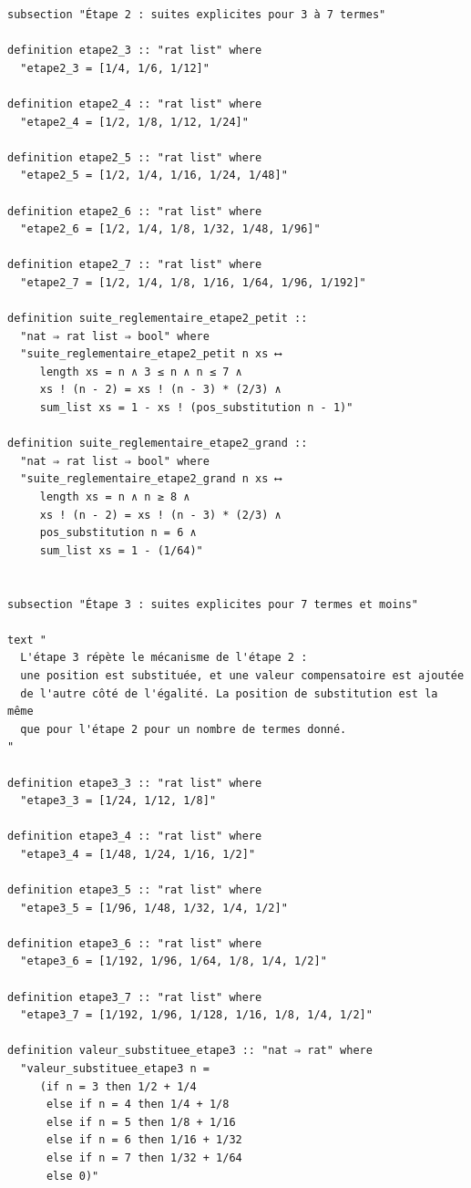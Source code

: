 \documentclass[a4paper,11pt]{article}
\begin{document}
\begin{holcode}[title={\textcolor{white}{Fichier : methode\_de\_philippot.thy -- COMPLET}}]
\begin{lstlisting}
subsection "Étape 2 : suites explicites pour 3 à 7 termes"

definition etape2_3 :: "rat list" where
  "etape2_3 = [1/4, 1/6, 1/12]"

definition etape2_4 :: "rat list" where
  "etape2_4 = [1/2, 1/8, 1/12, 1/24]"

definition etape2_5 :: "rat list" where
  "etape2_5 = [1/2, 1/4, 1/16, 1/24, 1/48]"

definition etape2_6 :: "rat list" where
  "etape2_6 = [1/2, 1/4, 1/8, 1/32, 1/48, 1/96]"

definition etape2_7 :: "rat list" where
  "etape2_7 = [1/2, 1/4, 1/8, 1/16, 1/64, 1/96, 1/192]"

definition suite_reglementaire_etape2_petit ::
  "nat ⇒ rat list ⇒ bool" where
  "suite_reglementaire_etape2_petit n xs ⟷
     length xs = n ∧ 3 ≤ n ∧ n ≤ 7 ∧
     xs ! (n - 2) = xs ! (n - 3) * (2/3) ∧
     sum_list xs = 1 - xs ! (pos_substitution n - 1)"

definition suite_reglementaire_etape2_grand ::
  "nat ⇒ rat list ⇒ bool" where
  "suite_reglementaire_etape2_grand n xs ⟷
     length xs = n ∧ n ≥ 8 ∧
     xs ! (n - 2) = xs ! (n - 3) * (2/3) ∧
     pos_substitution n = 6 ∧
     sum_list xs = 1 - (1/64)"


subsection "Étape 3 : suites explicites pour 7 termes et moins"

text "
  L'étape 3 répète le mécanisme de l'étape 2 :
  une position est substituée, et une valeur compensatoire est ajoutée
  de l'autre côté de l'égalité. La position de substitution est la même
  que pour l'étape 2 pour un nombre de termes donné.
"

definition etape3_3 :: "rat list" where
  "etape3_3 = [1/24, 1/12, 1/8]"

definition etape3_4 :: "rat list" where
  "etape3_4 = [1/48, 1/24, 1/16, 1/2]"

definition etape3_5 :: "rat list" where
  "etape3_5 = [1/96, 1/48, 1/32, 1/4, 1/2]"

definition etape3_6 :: "rat list" where
  "etape3_6 = [1/192, 1/96, 1/64, 1/8, 1/4, 1/2]"

definition etape3_7 :: "rat list" where
  "etape3_7 = [1/192, 1/96, 1/128, 1/16, 1/8, 1/4, 1/2]"

definition valeur_substituee_etape3 :: "nat ⇒ rat" where
  "valeur_substituee_etape3 n =
     (if n = 3 then 1/2 + 1/4
      else if n = 4 then 1/4 + 1/8
      else if n = 5 then 1/8 + 1/16
      else if n = 6 then 1/16 + 1/32
      else if n = 7 then 1/32 + 1/64
      else 0)"


\end{lstlisting}
\end{holcode}
\end{document}
